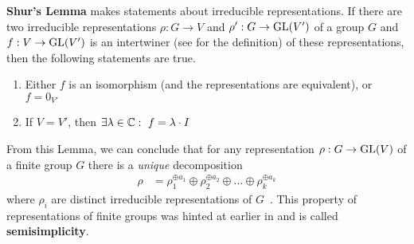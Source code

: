 \textbf{Shur's Lemma} makes statements about irreducible representations.
If there are two irreducible representations $\rho: G \to V$ and $\rho': G \to \operatorname{GL}(V')$ of a group $G$ and $f: V \to \operatorname{GL}(V')$ is an intertwiner (see  for the definition) of these representations, then the following statements are true.
\begin{enumerate}
    \item Either $f$ is an isomorphism (and the representations are equivalent), or $f = 0_{V'}$
    \item If $V = V'$, then $\exists \lambda \in \mathbb{C}:\ f = \lambda \cdot I$
\end{enumerate}
From this Lemma, we can conclude that for any representation $\rho: G \to \operatorname{GL}(V)$ of a finite group $G$ there is a \textit{unique} decomposition
\begin{align}
    \rho & = \rho_1^{\oplus a_1} \oplus \rho_2^{\oplus a_2} \oplus \ldots \oplus \rho_k^{\oplus a_k} 
\end{align}
where $\rho_i$ are distinct irreducible representations of $G$~\cite{fulton2013}.
This property of representations of finite groups was hinted at earlier in  and is called \textbf{semisimplicity}.
